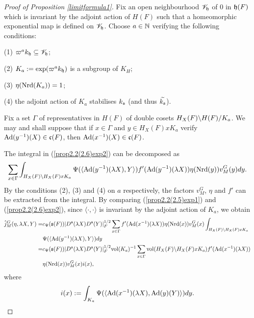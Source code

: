 \documentclass[a4paper]{amsart}
\newcommand{\vol}{{\mathrm{vol}}}                   \newcommand{\Vol}{{\mathrm{Vol}}}
\newcommand{\wt}{\widetilde}                        \newcommand{\wh}{\widehat}                      \newcommand{\wpair}[1]{\left\{{#1}\right\}}
\theoremstyle{definition}
\theoremstyle{remark}
\numberwithin{equation}{subsection}
\begin{document}
\begin{proof}[Proof of Proposition \ref{limitformula1}]
Fix an open neighbourhood $\mathscr{V}_{\mathfrak{h}}$ of $0$ in ${\mathfrak{h}}(F)$ which is invariant by the adjoint action of $H(F)$ such that a homeomorphic exponential map is defined on $\mathscr{V}_{\mathfrak{h}}$. Choose $a\in{\mathbb {N}}$ verifying the following conditions: 

(1) $\varpi^a k_{\mathfrak{h}}\subseteq\mathscr{V}_{\mathfrak{h}}$; 

(2) $K_a:=\exp(\varpi^a k_{\mathfrak{h}})$ is a subgroup of $K_H$; 

(3) $\eta({\mathrm{Nrd}}(K_a))=1$; 

(4) the adjoint action of $K_a$ stabilises $k_{\mathfrak{s}}$ (and thus $\wt{k_\fs}$). 

Fix a set $\Gamma$ of representatives in $H(F)$ of double cosets $H_X(F)\backslash H(F)/K_a$. 
We may and shall suppose that if $x\in\Gamma$ and $y\in H_X(F)xK_a$ verify ${\mathrm{Ad}}(y^{-1})(X)\in{\mathfrak{c}}(F)$, then ${\mathrm{Ad}}(x^{-1})(X)\in{\mathfrak{c}}(F)$. 

The integral in (\ref{prop2.2(2.6)exp2}) can be decomposed as
$$ \sum_{x\in\Gamma} \int_{H_X(F)\backslash H_X(F)xK_a} \Psi(\langle {\mathrm{Ad}}(y^{-1})(\lambda X),Y \rangle) f'({\mathrm{Ad}}(y^{-1})(\lambda X)) \eta({\mathrm{Nrd}}(y)) v_M^G(y) dy. $$
By the conditions (2), (3) and (4) on $a$ respectively, the factors $v_M^G$, $\eta$ and $f'$ can be extracted from the integral. By comparing (\ref{prop2.2(2.5)exp1}) and (\ref{prop2.2(2.6)exp2}), since $\langle\cdot,\cdot\rangle$ is invariant by the adjoint action of $K_a$, we obtain
\begin{equation}\label{prop2.2(2.7)}
\begin{split}
\hat{j}_M^G(\eta, \lambda X, Y)=&c_\Psi(\fs(F)) |D^\fs(\lambda X)D^\fs(Y)|_F^{1/2} \sum_{x\in\Gamma} f'(\Ad(x^{-1})(\lambda X)) \eta(\Nrd(x)) v_M^G(x) \int_{H_X(F)\bs H_X(F)xK_a} \\
&\Psi(\langle \Ad(y^{-1})(\lambda X),Y \rangle) dy \\
=&c_\Psi(\fs(F)) |D^\fs(\lambda X)D^\fs(Y)|_F^{1/2} \vol(K_a)^{-1} \sum_{x\in\Gamma} \vol(H_X(F)\bs H_X(F)xK_a) f'(\Ad(x^{-1})(\lambda X)) \\ 
&\eta(\Nrd(x)) v_M^G(x) i(x), 
\end{split}
\end{equation}
where
$$ i(x):=\int_{K_a} \Psi(\langle {\mathrm{Ad}}(x^{-1})(\lambda X),{\mathrm{Ad}}(y)(Y) \rangle) dy. $$


\end{proof}
\end{document}
